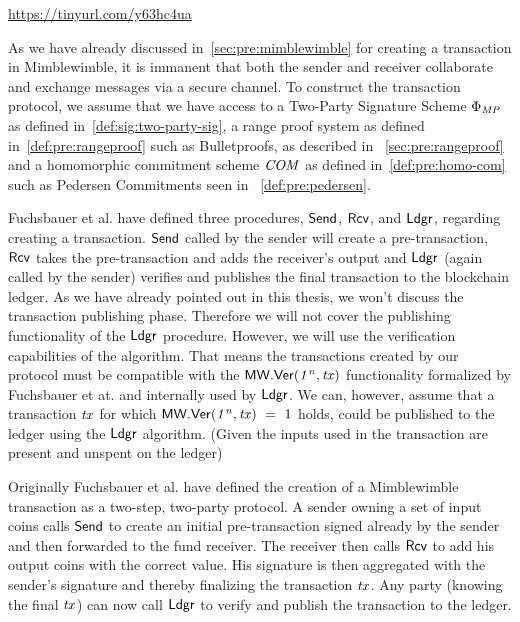 \urldef\urlgrinexplained\url{https://tinyurl.com/y63hc4ua}

As we have already discussed in~\cref{sec:pre:mimblewimble} for creating a transaction in Mimblewimble, it is immanent that both the sender and receiver collaborate and exchange messages via a secure channel.
To construct the transaction protocol, we assume that we have access to a Two-Party Signature Scheme $\Phi_{\mathit{MP}}$ as defined in~\cref{def:sig:two-party-sig}, a  range proof system as defined in~\cref{def:pre:rangeproof} such as Bulletproofs, as described in ~\cref{sec:pre:rangeproof} and a homomorphic commitment scheme $\mathit{COM}$ as defined in~\cref{def:pre:homo-com} such as Pedersen Commitments seen in ~\cref{def:pre:pedersen}.

Fuchsbauer et al. have defined three procedures, $\mathsf{Send}$, $\mathsf{Rcv}$, and $\mathsf{Ldgr}$, regarding creating a transaction.
$\mathsf{Send}$ called by the sender will create a pre-transaction, $\mathsf{Rcv}$ takes the pre-transaction and adds the receiver's output and $\mathsf{Ldgr}$ (again called by the sender) verifies and publishes the final transaction to the blockchain ledger.
As we have already pointed out in this thesis, we won't discuss the transaction publishing phase.
Therefore we will not cover the publishing functionality of the $\mathsf{Ldgr}$ procedure.
However, we will use the verification capabilities of the algorithm.
That means the transactions created by our protocol must be compatible with the $\mathsf{MW.Ver(\mathit{1^n}, \mathit{tx})}$ functionality formalized by Fuchsbauer et at. and internally used by $\mathsf{Ldgr}$.
We can, however, assume that a transaction $\mathit{tx}$ for which $\mathsf{MW.Ver(\mathit{1^n}, \mathit{tx})} ~=~ 1$ holds, could be published to the ledger using the $\mathsf{Ldgr}$ algorithm. (Given the inputs used in the transaction are present and unspent on the ledger)

Originally Fuchsbauer et al. have defined the creation of a Mimblewimble transaction as a two-step, two-party protocol.
A sender owning a set of input coins calls $\mathsf{Send}$ to create an initial pre-transaction signed already by the sender and then forwarded to the fund receiver.
The receiver then calls $\mathsf{Rcv}$ to add his output coins with the correct value.
His signature is then aggregated with the sender's signature and thereby finalizing the transaction $\mathit{tx}$.
Any party (knowing the final $\mathit{tx}$) can now call $\mathsf{Ldgr}$ to verify and publish the transaction to the ledger.

